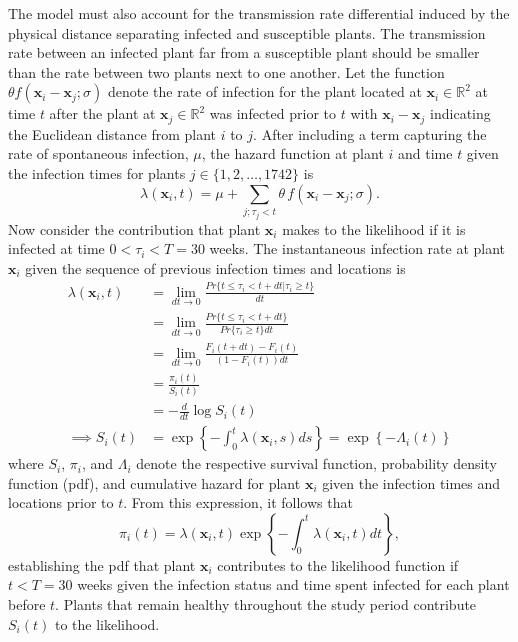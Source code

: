 \documentclass{uwstat572}
\begin{document}
The model must also account for the transmission rate differential induced by the physical distance separating infected and susceptible plants. 
The transmission rate between an infected plant far from a susceptible plant should be smaller than the rate between two plants next to one another.
Let the function $\theta f(\boldsymbol{x}_i -\boldsymbol{x}_j; \sigma)$ denote the rate of infection for the plant located at $\boldsymbol{\boldsymbol{x}}_i \in \mathbb{R}^2$ at time $t$ after the plant at $\boldsymbol{x}_j \in \mathbb{R}^2$ was infected prior to $t$ with $\boldsymbol{x}_i -\boldsymbol{x}_j$ indicating the Euclidean distance from plant $i$ to $j$. 
After including a term capturing the rate of spontaneous infection, $\mu$, the hazard function at plant $i$ and time $t$ given the infection times for plants $j \in \{1, 2, \dots, 1742\}$ is 
$$\lambda(\boldsymbol{x}_i,t) = \mu + \sum_{j; \tau_j<t} \theta \, f(\boldsymbol{x}_i - \boldsymbol{x}_j; \sigma).$$
Now consider the contribution that plant $\boldsymbol{x}_i$ makes to the likelihood if it is infected at time $0<\tau_i<T=30$ weeks. 
The instantaneous infection rate at plant $\boldsymbol{x}_i$ given the sequence of previous infection times and locations is
\begin{align*}
\lambda(\boldsymbol{x}_i, t) &= \lim_{dt \to 0} \frac{Pr\{ t \le \tau_i < t+dt | \tau_i \ge t \}}{dt} \\
	&= \lim_{dt \to 0} \frac{Pr\{ t \le \tau_i < t+dt\}}{Pr\{\tau_i\ge t\}dt}\\
	&= \lim_{dt \to 0} \frac{F_i(t+dt) - F_i(t)}{(1-F_i(t))dt} \\
	&= \frac{\pi_i(t)}{S_i(t)}\\
	&= -\frac{d}{dt} \log S_i(t) \\
\implies S_i(t) &= \exp \left\{ - \int_0^t \lambda(\boldsymbol{x}_i,s) ds  \right\} = \exp \left\{ - \Lambda_i(t)  \right\}
\end{align*}
where $S_i$, $\pi_i$, and $\Lambda_i$ denote the respective survival function, probability density function (pdf), and cumulative hazard for plant $\boldsymbol{x}_i$ given the infection times and locations prior to $t$. 
From this expression, it follows that
$$ \pi_i(t) = \lambda(\boldsymbol{x}_i,t) \exp \left\{ - \int_0^t \lambda(\boldsymbol{x}_i,t) dt  \right\},$$
establishing the pdf that plant $\boldsymbol{x}_i$ contributes to the likelihood function if $t<T=30$ weeks given the infection status and time spent infected for each plant before $t$. 
Plants that remain healthy throughout the study period contribute $S_i(t)$ to the likelihood. 
\end{document}
